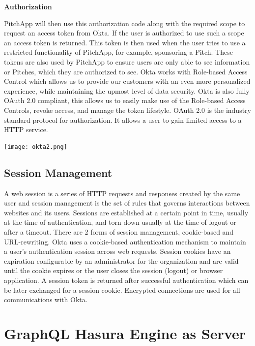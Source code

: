 \textbf{Authorization}

PitchApp will then use this authorization code along with the required scope to request an access token from Okta. If the user is authorized to use such a scope an access token is returned. This token is then used when the user tries to use a restricted functionality of PitchApp, for example, sponsoring a Pitch. These tokens are also used by PitchApp to ensure users are only able to see information or Pitches, which they are authorized to see.
Okta works with Role-based Access Control which allows us to provide our customers with an even more personalized experience, while maintaining the upmost level of data security. Okta is also fully OAuth 2.0 compliant, this allows us to easily make use of the Role-based Access Controls, revoke access, and manage the token lifestyle. OAuth 2.0 is the industry standard protocol for authorization. It allows a user to gain limited access to a HTTP service.

\begin{center}
	\texttt{[image: okta2.png]}
\end{center}

\subsection{Session Management}

A web session is a series of HTTP requests and responses created by the same user and session management is the set of rules that governs interactions between websites and its users. Sessions are established at a certain point in time, usually at the time of authentication, and torn down usually at the time of logout or after a timeout. There are 2 forms of session management, cookie-based and URL-rewriting.
Okta uses a cookie-based authentication mechanism to maintain a user's authentication session across web requests. Session cookies have an expiration configurable by an administrator for the organization and are valid until the cookie expires or the user closes the session (logout) or browser application. A session token is returned after successful authentication which can be later exchanged for a session cookie. Encrypted connections are used for all communications with Okta.

\pagebreak

\section{GraphQL Hasura Engine as Server}

